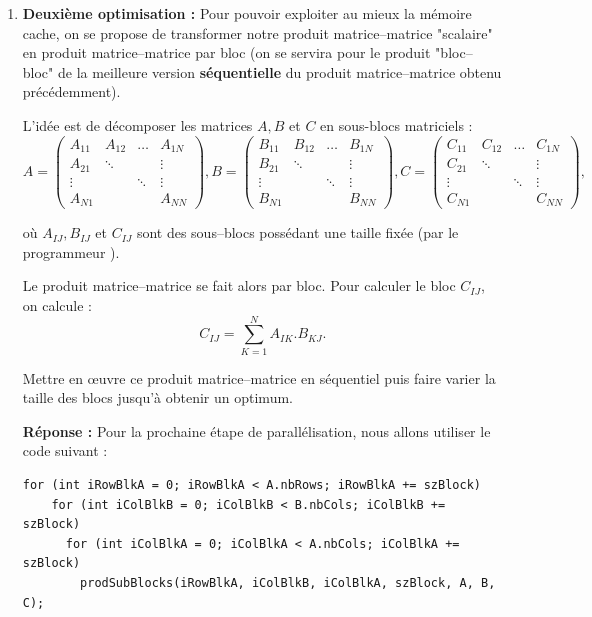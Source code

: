 \documentclass[11pt,a4paper]{article}
\begin{document}
\begin{enumerate}
	\item \textbf{\color{blue}Deuxième optimisation :} Pour pouvoir exploiter au mieux la mémoire cache, on se propose de transformer notre produit matrice--matrice "scalaire" en produit matrice--matrice par bloc (on se servira pour le produit "bloc--bloc" de la meilleure version \textbf{séquentielle} du produit matrice--matrice obtenu précédemment).

	L'idée est de décomposer les matrices $A,B$ et $C$ en sous-blocs matriciels :
	\[
	A = \left(
	\begin{array}{cccc}
	A_{11} & A_{12} & \ldots & A_{1N} \\
	A_{21} & \ddots &        & \vdots \\
	\vdots &        & \ddots & \vdots \\
	A_{N1} &        &        & A_{NN}
	\end{array}
	\right),
	B = \left(
	\begin{array}{cccc}
	B_{11} & B_{12} & \ldots & B_{1N} \\
	B_{21} & \ddots &        & \vdots \\
	\vdots &        & \ddots & \vdots \\
	B_{N1} &        &        & B_{NN}
	\end{array}
	\right),
	C = \left(
	\begin{array}{cccc}
	C_{11} & C_{12} & \ldots & C_{1N} \\
	C_{21} & \ddots &        & \vdots \\
	\vdots &        & \ddots & \vdots \\
	C_{N1} &        &        & C_{NN}
	\end{array}
	\right),
	\]

où $A_{IJ},B_{IJ}$ et $C_{IJ}$ sont des sous--blocs possédant une taille fixée (par le programmeur ).

Le produit matrice--matrice se fait alors par bloc. Pour calculer le bloc $C_{IJ}$, on calcule :
\[
C_{IJ} = \sum_{K=1}^{N}A_{IK}.B_{KJ}.
\]

Mettre en {\oe}uvre ce produit matrice--matrice en séquentiel puis faire varier la taille des blocs jusqu'à obtenir un optimum.


\textbf{Réponse :} 
Pour la prochaine étape de parallélisation, nous allons utiliser le code suivant :

\begin{lstlisting}[caption={Parallélisation avec OpenMP}, label={lst:parallel}]
  for (int iRowBlkA = 0; iRowBlkA < A.nbRows; iRowBlkA += szBlock)
    for (int iColBlkB = 0; iColBlkB < B.nbCols; iColBlkB += szBlock)
      for (int iColBlkA = 0; iColBlkA < A.nbCols; iColBlkA += szBlock)
        prodSubBlocks(iRowBlkA, iColBlkB, iColBlkA, szBlock, A, B, C);
\end{lstlisting}


\end{enumerate}
\end{document}
